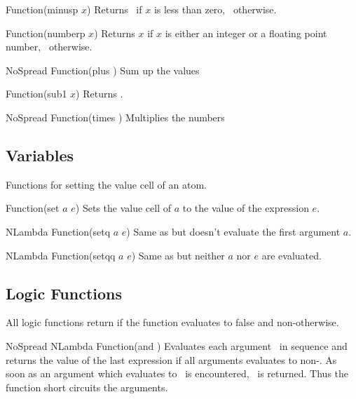 \begin{defun}{Function}{(minusp $x$)}
  Returns \T\ if $x$ is less than zero, \NIL\ otherwise.
\end{defun}

\begin{defun}{Function}{(numberp $x$)}
  Returns $x$ if $x$ is either an integer or a floating point number,
  \NIL\ otherwise.
\end{defun}

\begin{defun}{NoSpread Function}{(plus \xargs)}
  Sum up the values \largs
\end{defun}

\begin{defun}{Function}{(sub1 $x$)}
  Returns .
\end{defun}

\begin{defun}{NoSpread Function}{(times \xargs)}
  Multiplies the numbers \largs
\end{defun}

\subsection{Variables}
Functions for setting the value cell of an atom.

\begin{defun}{Function}{(set $a$ $e$)}
  Sets the value cell of $a$ to the value of the expression $e$.
\end{defun}

\begin{defun}{NLambda Function}{(setq $a$ $e$)}
  Same as  but doesn't evaluate the first argument $a$.
\end{defun}

\begin{defun}{NLambda Function}{(setqq $a$ $e$)}
  Same as  but neither $a$ nor $e$ are evaluated.
\end{defun}

\subsection{Logic Functions}
All logic functions return \NIL if the function evaluates to false and
non-\NIL otherwise.

\begin{defun}{NoSpread NLambda Function}{(and \xargs)}
  Evaluates each argument \largs\ in sequence and returns the value of
  the last expression if all arguments evaluates to non-\NIL. As soon
  as an argument which evaluates to \NIL\ is encountered, \NIL\ is
  returned. Thus the function short circuits the arguments.
\end{defun}

